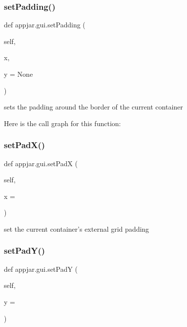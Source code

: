 \begin{DoxyVerb}
\subsubsection{\texorpdfstring{set\+Padding()}{setPadding()}}
{\footnotesize\ttfamily def appjar.\+gui.\+set\+Padding (\begin{DoxyParamCaption}\item[{}]{self,  }\item[{}]{x,  }\item[{}]{y = {\ttfamily None} }\end{DoxyParamCaption})}

\begin{DoxyVerb}sets the padding around the border of the current container \end{DoxyVerb}
 Here is the call graph for this function\+:
\mbox{\label{classappjar_1_1gui_ad35b686450ff4316f6b4f8a36739e7b2}} 
\subsubsection{\texorpdfstring{set\+Pad\+X()}{setPadX()}}
{\footnotesize\ttfamily def appjar.\+gui.\+set\+PadX (\begin{DoxyParamCaption}\item[{}]{self,  }\item[{}]{x = {} }\end{DoxyParamCaption})}

\begin{DoxyVerb}set the current container's external grid padding \end{DoxyVerb}
 \mbox{\label{classappjar_1_1gui_adf56e64b098d2f072711b2ad12901b38}} 
\subsubsection{\texorpdfstring{set\+Pad\+Y()}{setPadY()}}
{\footnotesize\ttfamily def appjar.\+gui.\+set\+PadY (\begin{DoxyParamCaption}\item[{}]{self,  }\item[{}]{y = {} }\end{DoxyParamCaption})}


\end{DoxyVerb}
